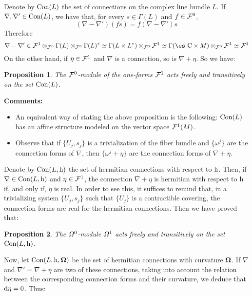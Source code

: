 \documentclass[12pt]{article}
\theoremstyle{plain}
\newtheorem{prop}{Proposition}
\def\d{{\rm d}}
\def\h{{\rm h}}
\def\curv{{\bf \Omega}}
\def\Complex{\mbox{\es C}}
\begin{document}
Denote by ${\rm Con}(L)$ the set of connections on the complex
line bundle $L$. If $\nabla , \nabla ' \in {\rm Con}(L)$, we have
that, for every $s \in \Gamma (L)$ and $f \in {\cal F}^0$, $$
(\nabla - \nabla ')(fs) = f(\nabla - \nabla ')s $$ Therefore $$
\nabla - \nabla '\in {\cal F}^1\otimes_{{\cal F}^0}\Gamma (L)
\otimes_{{\cal F}^0}\Gamma (L)^* \simeq \Gamma (L \times
L^*)\otimes_{{\cal F}^0}{\cal F}^1 \simeq \Gamma (\Complex \times
M)\otimes_{{\cal F}^0}{\cal F}^1 \simeq {\cal F}^1 $$ On the other
hand, if $\eta \in {\cal F}^1$ and $\nabla$ is a connection, so is
$\nabla + \eta$. So we have:

\begin{prop}
The ${\cal F}^0$-module of the one-forms
${\cal F}^1$
acts freely and transitively on the set
${\rm Con}(L)$.
\end{prop}

{\bf Comments:}
\begin{itemize}
\item
An equivalent way of stating the above proposition is the following:
${\rm Con}(L)$ has an affine structure modeled on the vector space
${\cal F}^1(M)$.
\item
Observe that if
$\{ U_j,s_j \}$
is a trivialization of the fiber bundle and
$\{ \omega^j \}$
are the connection forms of $\nabla$, then
$\{ \omega^j + \eta \}$
are the connection forms of $\nabla + \eta$.
\end{itemize}

Denote by ${\rm Con}(L,\h )$
the set of hermitian connections with respect to $\h$.
Then, if $\nabla \in {\rm Con}(L,\h )$
and $\eta \in {\cal F}^1$,
the connection $\nabla + \eta$
is hermitian with respect to $\h$
if, and only if, $\eta$ is real.
In order to see this, it suffices to remind that,
in a trivializing system $\{ U_j,s_j \}$
such that $\{ U_j \}$ is a contractible covering,
the connection forms are real for the hermitian connections.
Then we have proved that:

\begin{prop}
The ${\mit\Omega}^0$-module ${\mit\Omega}^1$
acts freely and transitively on the set
${\rm Con}(L,\h )$.
\end{prop}

Now, let ${\rm Con}(L,\h ,\curv )$
be the set of hermitian connections with curvature $\curv $.
If $\nabla$ and $\nabla ' = \nabla + \eta$
are two of these connections, taking into account the relation between
the corresponding connection forms and their curvature,
we deduce that $\d \eta = 0$. Thus:
\end{document}
